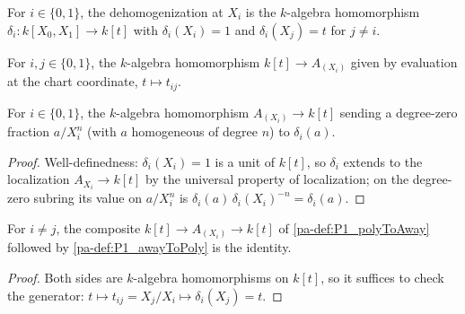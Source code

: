 \begin{definition}[Dehomogenization]
  \label{pa-def:P1_dehomogenize}
  \leanok

  For \(i \in \{0,1\}\), the dehomogenization at \(X_i\) is the \(k\)-algebra homomorphism
  \(\delta_i : k[X_0, X_1] \to k[t]\) with \(\delta_i(X_i) = 1\) and \(\delta_i(X_j) = t\) for
  \(j \neq i\).
\end{definition}

\begin{definition}
  \label{pa-def:P1_polyToAway}
  \leanok

  For \(i, j \in \{0,1\}\), the \(k\)-algebra homomorphism \(k[t] \to A_{(X_i)}\) given by
  evaluation at the chart coordinate, \(t \mapsto t_{ij}\).
\end{definition}

\begin{definition}
  \label{pa-def:P1_awayToPoly}
  \leanok

  For \(i \in \{0,1\}\), the \(k\)-algebra homomorphism \(A_{(X_i)} \to k[t]\) sending a
  degree-zero fraction \(a / X_i^n\) (with \(a\) homogeneous of degree \(n\)) to
  \(\delta_i(a)\).
\end{definition}
\begin{proof}
  \leanok
  Well-definedness: \(\delta_i(X_i) = 1\) is a unit of \(k[t]\), so \(\delta_i\) extends to
  the localization \(A_{X_i} \to k[t]\) by the universal property of localization; on the
  degree-zero subring its value on \(a / X_i^n\) is
  \(\delta_i(a)\,\delta_i(X_i)^{-n} = \delta_i(a)\).
\end{proof}

\begin{lemma}
  \label{pa-lem:P1_awayToPoly_polyToAway}
  \leanok

  For \(i \neq j\), the composite \(k[t] \to A_{(X_i)} \to k[t]\) of
  \ref{pa-def:P1_polyToAway} followed by \ref{pa-def:P1_awayToPoly} is the identity.
\end{lemma}
\begin{proof}
  \leanok
  Both sides are \(k\)-algebra homomorphisms on \(k[t]\), so it suffices to check the
  generator: \(t \mapsto t_{ij} = X_j / X_i \mapsto \delta_i(X_j) = t\).
\end{proof}

